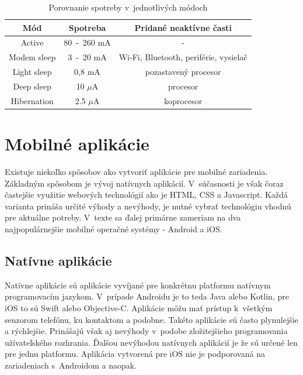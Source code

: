 \begin{table}[ht]
    \centering
    \renewcommand{\arraystretch}{1.5}
    \begin{tabular}{|c|c|c|}
        \hline
        Mód & Spotreba & Pridané neaktívne časti \\ \hline
        Active & 80~-~260 mA\footnotemark[5] & - \\ \hline
        Modem sleep & 3~-~20 mA & Wi-Fi, Bluetooth, periférie, vysielač\\ \hline
        Light sleep & 0,8 mA & pozastavený procesor\\ \hline
        Deep sleep & 10 $\mu$A & procesor\\ \hline
        Hibernation & 2.5 $\mu$A & koprocesor\\ \hline
    \end{tabular}
    \caption[Porovnanie spotreby v~jednotlivých módoch]{Porovnanie spotreby v~jednotlivých módoch\cite{esp-sleep}}
    \label{tab:spotreba_esp}
\end{table}



\chapter{Mobilné aplikácie}

Existuje niekoľko spôsobov ako vytvoriť aplikácie pre mobilné zariadenia. Základným spôsobom je vývoj natívnych aplikácií. V~súčasnosti je však čoraz častejšie využitie webových technológií ako je HTML, CSS a Javascript. Každá varianta prináša určité výhody a nevýhody, je nutné vybrať technológiu vhodnú pre aktuálne potreby. V~texte sa ďalej primárne zameriam na dva najpopulárnejšie mobilné operačné systémy - Android a iOS.

\section{Natívne aplikácie}

Natívne aplikácie sú aplikácie vyvíjané pre konkrétnu platformu natívnym programovacím jazykom. V~prípade Androidu je to teda Java alebo Kotlin, pre iOS to sú Swift alebo Objective-C. Aplikácie môžu mať prístup k~všetkým senzorom telefónu, ku kontaktom a podobne. Takéto aplikácie sú často plynulejšie a rýchlejšie. Prinášajú však aj nevýhody v~podobe zložitejšieho programovania užívateľského rozhrania. Ďalšou nevýhodou natívnych aplikácií je že sú určené len pre jednu platformu. Aplikácia vytvorená pre iOS nie je podporovaná na zariadeniach s~Androidom a naopak.\cite{hybrid-app}

